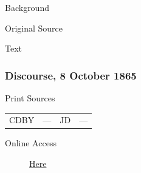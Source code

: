 				\begin{description}
					\item[Background]
				\end{description}
				
					\phantom{.}
				
				\begin{description}
					\item[Original Source]
				\end{description}
				
					\phantom{.}
				
				\begin{description}
					\item[Text]
				\end{description}
					
					\phantom{.}
					
		\subsubsection{Discourse, 8 October 1865}
			\label{EMS-1865-BY-8-OCT-1865}
			
			\begin{description}
					\item[Print Sources]
				\end{description}

					\begin{tabular}{p{0.5in}p{1in}p{0.5in}p{1in}}
					CDBY	& ---		& JD 		& --- \\
					\end{tabular}
				
				\begin{description}
					\item[Online Access] \href{https://drive.google.com/file/d/15pvobBC-TLed6uWG4HVk5eTXwkMXbjt5/view?usp=sharing}{Here}
				\end{description}
				
